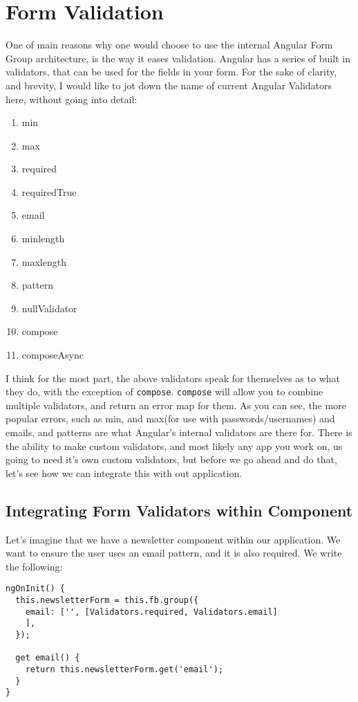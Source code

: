 \chapter{ Form Validation }

One of main reasons why one would choose to use the internal Angular Form 
Group architecture, is the way it eases validation. Angular has a series 
of built in validators, that can be used for the fields in your form. For 
the sake of clarity, and brevity, I would like to jot down the name of current 
Angular Validators here, without going into detail: 
\begin{enumerate}
  \item min
  \item max
  \item required
  \item requiredTrue
  \item email
  \item minlength
  \item maxlength
  \item pattern
  \item nullValidator
  \item compose
  \item composeAsync
\end{enumerate}

I think for the most part, the above validators speak for themselves as to 
what they do, with the exception of \lstinline{compose}. \lstinline{compose}
will allow you to combine multiple validators, and return an error map for 
them. As you can see, the more popular errors, such as min, and max(for use
with passwords/usernames) and emails, and patterns are what Angular's internal 
validators are there for. There is the ability to make custom validators, and 
most likely any app you work on, us going to need it's own custom validators,
but before we go ahead and do that, let's see how we can integrate this with
out application. 

\section{Integrating Form Validators within Component}
Let's imagine that we have a newsletter component within our application. We 
want to ensure the user uses an email pattern, and it is also required. We write 
the following: 
\begin{lstlisting}
ngOnInit() {
  this.newsletterForm = this.fb.group({
    email: ['', [Validators.required, Validators.email]
    ],
  });

  get email() {
    return this.newsletterForm.get('email');
  }
}
\end{lstlisting}

